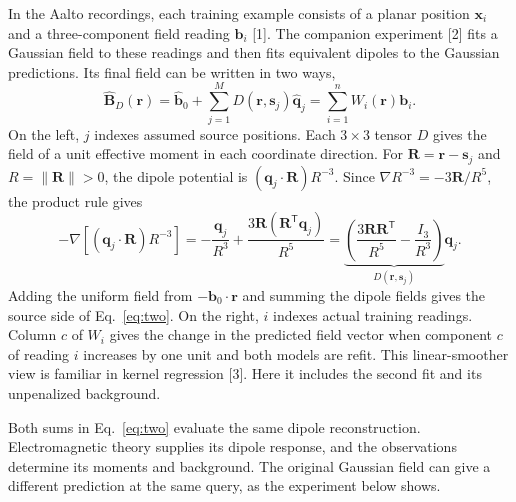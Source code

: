 \documentclass[11pt,letterpaper]{article}
\newcommand{\B}{\mathbf B}
\newcommand{\bb}{\mathbf b}
\newcommand{\rr}{\mathbf r}
\newcommand{\xx}{\mathbf x}
\begin{document}
In the Aalto recordings, each training example consists of a planar position
\(\xx_i\) and a three-component field reading \(\bb_i\) [1]. The companion
experiment [2] fits a Gaussian field to these readings and then fits equivalent
dipoles to the Gaussian predictions. Its final field can be written in two ways,
\begin{equation}
\widehat{\B}_D(\rr)
=\widehat{\bb}_0+\sum_{j=1}^{M}D(\rr,\mathbf s_j)\widehat{\mathbf q}_j
=\sum_{i=1}^{n}W_i(\rr)\bb_i .
\label{eq:two}
\end{equation}
On the left, \(j\) indexes assumed source positions. Each \(3\times3\) tensor
\(D\) gives the field of a unit effective moment in each coordinate direction.
For \(\mathbf R=\rr-\mathbf s_j\) and \(R=\|\mathbf R\|>0\), the dipole
potential is \((\mathbf q_j\cdot\mathbf R)R^{-3}\). Since
\(\nabla R^{-3}=-3\mathbf R/R^5\), the product rule gives
\[
-\nabla\!\left[(\mathbf q_j\cdot\mathbf R)R^{-3}\right]
=-\frac{\mathbf q_j}{R^3}+\frac{3\mathbf R(\mathbf R^{\mathsf T}\mathbf q_j)}{R^5}
=\underbrace{\left(\frac{3\mathbf R\mathbf R^{\mathsf T}}{R^5}
                  -\frac{I_3}{R^3}\right)}_{D(\rr,\mathbf s_j)}\mathbf q_j .
\]
Adding the uniform field from \(-\bb_0\cdot\rr\) and summing the dipole
fields gives the source side of Eq.~\eqref{eq:two}.
On the right, \(i\) indexes actual training readings. Column \(c\) of \(W_i\)
gives the change in the predicted field vector when component \(c\) of reading
\(i\) increases by one unit and both models are refit. This linear-smoother
view is familiar in kernel regression [3]. Here it includes the second fit
and its unpenalized background.

Both sums in Eq.~\eqref{eq:two} evaluate the same dipole reconstruction.
Electromagnetic theory supplies its dipole response, and the observations
determine its moments and background. The original Gaussian field can give
a different prediction at the same query, as the experiment below shows.
\end{document}
